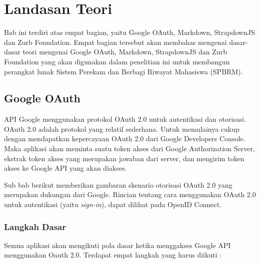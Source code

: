 \chapter{Landasan Teori}
\label{chap:landasanteori}

Bab ini terdiri atas empat bagian, yaitu Google OAuth, Markdown, StrapdownJS dan Zurb Foundation. Empat bagian tersebut akan membahas mengenai dasar-dasar teori mengenai Google OAuth, Markdown, StrapdownJS dan Zurb Foundation yang akan digunakan dalam penelitian ini untuk membangun perangkat lunak Sistem Perekam dan Berbagi Riwayat Mahasiswa (SPBRM).

\section{Google OAuth \cite{Oauth:2013}}
\label{sec:googleauthentication}

API Google menggunakan protokol OAuth 2.0 untuk autentikasi dan otorisasi. OAuth 2.0 adalah protokol yang relatif sederhana. Untuk memulainya cukup dengan mendapatkan kepercayaan OAuth 2.0 dari Google Developers Console\footnotemark[1]. Maka aplikasi akan meminta suatu token akses dari Google Authorization Server, ekstrak token akses yang merupakan jawaban dari server, dan mengirim token akses ke Google API yang akan diakses.


Sub bab berikut memberikan gambaran skenario otorisasi OAuth 2.0 yang merupakan dukungan dari Google. Rincian tentang cara menggunakan OAuth 2.0 untuk autentikasi (yaitu {\it sign-in}), dapat dilihat pada OpenID Connect\footnotemark[2].

\subsection{Langkah Dasar}
Semua aplikasi akan mengikuti pola dasar ketika menggakses Google API menggunakan Oauth 2.0. Terdapat empat langkah yang harus diikuti :

